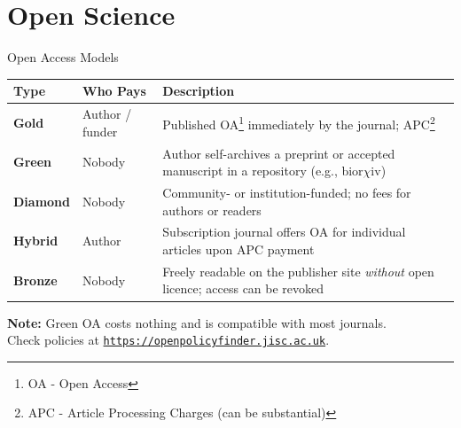 \documentclass{beamer}
\begin{document}

\section{Open Science}

\begin{frame}{Open Access Models}

  \smallskip
  {\footnotesize
  \begin{tabular}{@{}lp{2.2cm}p{5.8cm}@{}}
    \hline
    \textbf{Type} & \textbf{Who Pays} & \textbf{Description} \\
    \hline
    \textbf{Gold}    & Author / funder   & Published OA\footnote{OA - Open Access} immediately by the journal; APC\footnote{APC - Article Processing Charges (can be substantial)} \\
    \textbf{Green}   & Nobody            & Author self-archives a preprint or accepted manuscript in a repository (e.g., bior$\chi$iv) \\
    \textbf{Diamond} & Nobody            & Community- or institution-funded; no fees for authors or readers \\
    \textbf{Hybrid}  & Author            & Subscription journal offers OA for individual articles upon APC payment \\
    \textbf{Bronze}  & Nobody            & Freely readable on the publisher site \emph{without} open licence; access can be revoked \\
    \hline
  \end{tabular}
  }

  \medskip
  \small
  \textbf{Note:} Green OA costs nothing and is compatible with most journals.\\
  Check policies at \href{https://openpolicyfinder.jisc.ac.uk}{\texttt{https://openpolicyfinder.jisc.ac.uk}}.

\end{frame}
\end{document}

